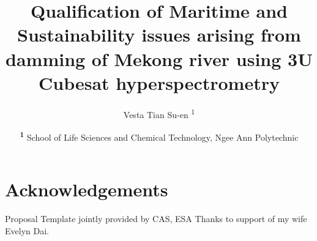 \documentclass[twocolumn]{NobArticle}
\title{Qualification of Maritime and Sustainability issues arising from damming of Mekong river using 3U Cubesat hyperspectrometry}
\author{
    Vesta Tian Su-en \textsuperscript{1}
}
\date{
    \textsuperscript{\textbf{1}}
    School of Life Sciences and Chemical Technology, Ngee Ann Polytechnic
}
\begin{document}
\small
\maketitle








\section*{Acknowledgements}
Proposal Template jointly provided by CAS, ESA
Thanks to support of my wife Evelyn Dai.

\printbibliography
\end{document}
